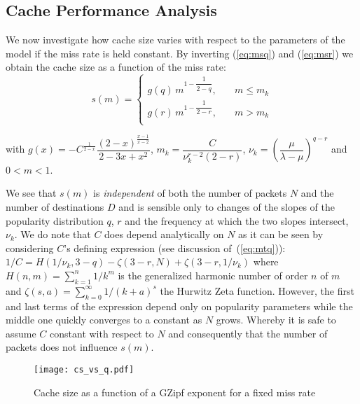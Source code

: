 \documentclass[twocolumn, 10pt]{article}
\theoremstyle{plain}
\begin{document}
\subsection{Cache Performance Analysis}\label{sec:cache_bounds}
We now investigate how cache size varies with respect to the parameters of the
model if the miss rate is held constant. By inverting (\ref{eq:msq}) and (\ref{eq:msr}) we obtain the cache size
as a function of the miss rate:
\begin{equation}
    s(m)= 
    \begin{cases}
        g(q)\,m^{1-\dfrac{1}{2-q}}, & \quad m \le m_k \\
        g(r)\,m^{1-\dfrac{1}{2-r}}, & \quad m > m_k \\
    \end{cases}
    \label{eq:sm_both}
\end{equation}

\noindent with $g(x)=-C^{\frac{1}{2-x}}\dfrac{ (2-x)^{\frac{x-1}{x-2}}
}{2-3x+x^2}$,  $m_k = \dfrac{C}{\nu_k^{r-2} (2-r)}$,
$\nu_k=\left(\dfrac{\mu}{\lambda-\mu}\right)^{q-r}$ and $0<m<1$. 

We see that $s(m)$ is \emph{independent} of both the number of packets $N$
and the number of destinations $D$ and is sensible
only to changes of the slopes of the popularity distribution $q$, $r$ and the
frequency at which the two slopes intersect, $\nu_k$. We do note that $C$ does depend
analytically on $N$ as it can be seen by considering $C$'s defining expression
(see discussion of~(\ref{eq:mtq})):
$1/C=H(1/\nu_k,3-q)-\zeta(3-r,N)+\zeta(3-r, 1/\nu_k)$ where
$H(n,m)=\sum\limits_{k=1}^n 1/k^m$ is the generalized harmonic number of order
$n$ of $m$ and $\zeta(s,a)=\sum\limits_{k=0}^\infty 1/(k+a)^s$ the Hurwitz
Zeta function.  However, the first and last terms of the expression depend
only on popularity parameters while the middle one quickly converges to a
constant as $N$ grows. Whereby it is safe to assume $C$ constant with
respect to $N$ and consequently that the number of packets does not influence
$s(m)$.


\begin{figure}[h]
    \centering
    \texttt{[image: cs\_vs\_q.pdf]}
    \caption{Cache size as a function of a GZipf exponent for a fixed miss rate}
    \label{fig:cs_vs_q}
\end{figure}
\end{document}

